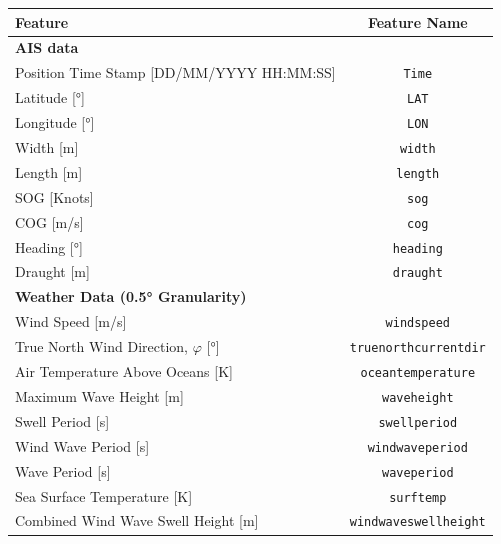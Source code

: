 \begin{table}
    \centering
    {\begin{tabular}{ |p{8cm}|c| }
    \hline
    \textbf{Feature} & \textbf{Feature Name}  \\
    \hline
    \multicolumn{2}{|l|}{\textbf{AIS data}}\\
    \hline
    Position Time Stamp [DD\slash MM\slash YYYY HH:MM:SS] & {\tt Time} \\
    \hline
    Latitude [°] & {\tt LAT}   \\
    \hline
    Longitude [°] & {\tt LON}  \\
    \hline
    Width [m] & {\tt width}  \\
    \hline
    Length [m] & {\tt length}\\
    \hline
    SOG [Knots] & {\tt sog} \\
    \hline
    COG [m/s] & {\tt cog}  \\
    \hline
    Heading [°] & {\tt heading}  \\
    \hline
    Draught [m] & {\tt draught} \\
    \hline
    \multicolumn{2}{|l|}{\textbf{Weather Data (0.5° Granularity)}}\\
    \hline
    Wind Speed [m/s] & {\tt windspeed} \\
    \hline
    True North Wind Direction, $\varphi$ [°] & {\tt truenorthcurrentdir} \\
    \hline
    Air Temperature Above Oceans [K] & {\tt oceantemperature} \\
    \hline
    Maximum Wave Height [m] & {\tt waveheight} \\
    \hline
    Swell Period [s] & {\tt swellperiod} \\
    \hline
    Wind Wave Period [s] & {\tt windwaveperiod}\\
    \hline
    Wave Period [s] & {\tt waveperiod}\\
    \hline
    Sea Surface Temperature [K] & {\tt surftemp}\\
    \hline
    Combined Wind Wave Swell Height [m] &  {\tt windwaveswellheight} \\

\end{tabular}}
\end{table}
